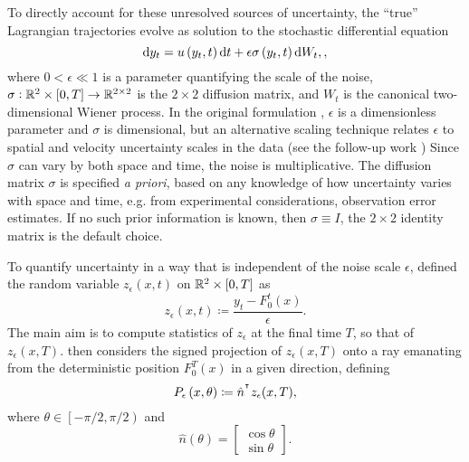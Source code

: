 To directly account for these unresolved sources of uncertainty, the ``true'' Lagrangian trajectories evolve as solution to the stochastic differential equation
\begin{equation}
	\sde{y_t}{u\left(y_t, t\right)}{\epsilon\sigma\left(y_t, t\right)},
	\label{eqn:ss_sde},
\end{equation}
where \(0 < \epsilon \ll 1\) is a parameter quantifying the scale of the noise, \(\sigma:	\mathbb{R}^2\times[0,T] \to \mathbb{R}^{2\times 2}\) is the \(2\times 2\) diffusion matrix, and \(W_t\) is the canonical two-dimensional Wiener process.
In the original formulation \cite{Balasuriya_2020_StochasticSensitivityComputable}, \(\epsilon\) is a dimensionless parameter and \(\sigma\) is dimensional, but an alternative scaling technique relates \(\epsilon\) to spatial and velocity uncertainty scales in the data (see the follow-up work \cite{BadzaEtAl_2023_HowSensitiveAre,Balasuriya_2020_UncertaintyFinitetimeLyapunov,FangEtAl_2020_DisentanglingResolutionPrecision})
Since \(\sigma\) can vary by both space and time, the noise is multiplicative.
The diffusion matrix \(\sigma\) is specified \emph{a priori}, based on any knowledge of how uncertainty varies with space and time, e.g. from experimental considerations, observation error estimates.
If no such prior information is known, then \(\sigma \equiv I\), the \(2 \times 2\) identity matrix is the default choice.

To quantify uncertainty in a way that is independent of the noise scale \(\epsilon\), \citet{Balasuriya_2020_StochasticSensitivityComputable} defined the random variable \(z_\epsilon\left(x,t\right)\) on \(\mathbb{R}^2 \times [0,T]\) as
\[
	z_\epsilon\left(x,t\right) \coloneqq \frac{y_t - F_0^t(x)}{\epsilon}.
\]
The main aim is to compute statistics of \(z_\epsilon\) at the final time \(T\), so that of \(z_\epsilon\left(x,T\right)\).
\citet{Balasuriya_2020_StochasticSensitivityComputable} then considers the signed projection of \(z_\epsilon\left(x,T\right)\) onto a ray emanating from the deterministic position \(F_0^T(x)\) in a given direction, defining
\[
	P_\epsilon\left(x,\theta\right) \coloneqq \hat{n}^{^{\intercal}} z_\epsilon(x,T),
\]
where \(\theta \in \left[-\pi/2, \pi/2\right)\) and
\[
	\hat{n}(\theta) = \begin{bmatrix}
		\cos{\theta} \\
		\sin{\theta}
	\end{bmatrix}.
\]

